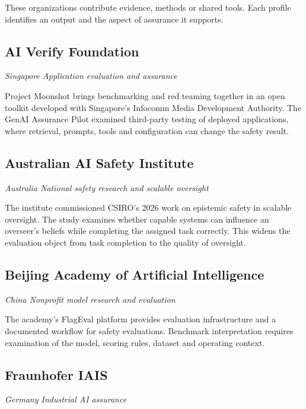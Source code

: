 These organizations contribute evidence, methods or shared tools. Each profile identifies an output and the aspect of assurance it supports.

\subsection{AI Verify Foundation}

\textit{Singapore  \textbullet{}  Application evaluation and assurance}

Project Moonshot brings benchmarking and red teaming together in an open toolkit developed with Singapore's Infocomm Media Development Authority. The GenAI Assurance Pilot examined third-party testing of deployed applications, where retrieval, prompts, tools and configuration can change the safety result.~\cite{src61,src62}

\subsection{Australian AI Safety Institute}

\textit{Australia  \textbullet{}  National safety research and scalable oversight}

The institute commissioned CSIRO's 2026 work on epistemic safety in scalable oversight. The study examines whether capable systems can influence an overseer's beliefs while completing the assigned task correctly. This widens the evaluation object from task completion to the quality of oversight.~\cite{src63,src64}

\subsection{Beijing Academy of Artificial Intelligence}

\textit{China  \textbullet{}  Nonprofit model research and evaluation}

The academy's FlagEval platform provides evaluation infrastructure and a documented workflow for safety evaluations. Benchmark interpretation requires examination of the model, scoring rules, dataset and operating context.~\cite{src65,src66}

\subsection{Fraunhofer IAIS}

\textit{Germany  \textbullet{}  Industrial AI assurance}

